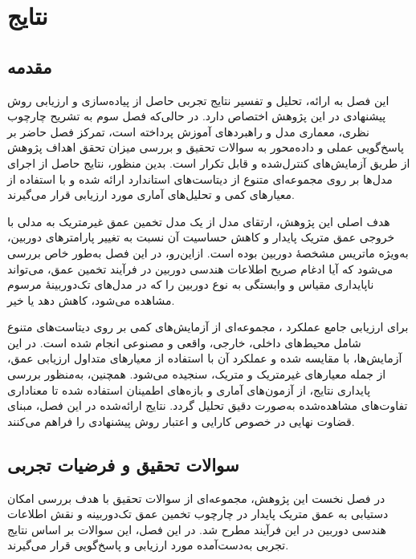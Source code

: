 \chapter{نتایج}
\label{chap:results}

\section{مقدمه}
این فصل به ارائه، تحلیل و تفسیر نتایج تجربی حاصل از پیاده‌سازی و ارزیابی
روش پیشنهادی در این پژوهش اختصاص دارد.
در حالی‌که فصل سوم به تشریح چارچوب نظری، معماری مدل و راهبردهای آموزش پرداخته است،
تمرکز فصل حاضر بر پاسخ‌گویی عملی و داده‌محور به سوالات تحقیق
و بررسی میزان تحقق اهداف پژوهش از طریق آزمایش‌های کنترل‌شده و قابل تکرار است.
بدین منظور، نتایج حاصل از اجرای مدل‌ها بر روی مجموعه‌ای متنوع از دیتاست‌های
استاندارد ارائه شده و با استفاده از معیارهای کمی و تحلیل‌های آماری
مورد ارزیابی قرار می‌گیرند.

هدف اصلی این پژوهش، ارتقای مدل  از یک مدل
تخمین عمق غیرمتریک
به مدلی با خروجی عمق متریک پایدار
و کاهش حساسیت آن نسبت به تغییر پارامترهای دوربین،
به‌ویژه ماتریس مشخصهٔ دوربین بوده است.
ازاین‌رو، در این فصل به‌طور خاص بررسی می‌شود که آیا ادغام صریح
اطلاعات هندسی دوربین در فرآیند تخمین عمق،
می‌تواند ناپایداری مقیاس و وابستگی به نوع دوربین را
که در مدل‌های تک‌دوربینهٔ مرسوم مشاهده می‌شود، کاهش دهد یا خیر.

برای ارزیابی جامع عملکرد \proposedmodel{}،
مجموعه‌ای از آزمایش‌های کمی بر روی دیتاست‌های متنوع شامل
محیط‌های داخلی، خارجی، واقعی و مصنوعی انجام شده است.
در این آزمایش‌ها، \proposedmodel{} با \basemodel{} مقایسه شده
و عملکرد آن با استفاده از معیارهای متداول ارزیابی عمق،
از جمله معیارهای غیرمتریک و متریک، سنجیده می‌شود.
همچنین، به‌منظور بررسی پایداری نتایج،
از آزمون‌های آماری و بازه‌های اطمینان استفاده شده
تا معناداری تفاوت‌های مشاهده‌شده به‌صورت دقیق تحلیل گردد.
نتایج ارائه‌شده در این فصل، مبنای قضاوت نهایی
در خصوص کارایی و اعتبار روش پیشنهادی را فراهم می‌کنند.


\section{سوالات تحقیق و فرضیات تجربی}
\label{sec:research_questions}

در فصل نخست این پژوهش، مجموعه‌ای از سوالات تحقیق با هدف بررسی
امکان دستیابی به عمق متریک پایدار در چارچوب تخمین عمق تک‌دوربینه
و نقش اطلاعات هندسی دوربین در این فرآیند مطرح شد.
در این فصل، این سوالات بر اساس نتایج تجربی به‌دست‌آمده
مورد ارزیابی و پاسخ‌گویی قرار می‌گیرند.

